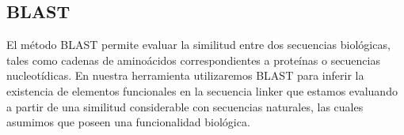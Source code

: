 
































\subsection{BLAST}\label{blast}

El método BLAST \cite{altschul1990basic,mcginnis2004blast} permite evaluar la similitud entre dos secuencias biológicas, tales como cadenas de aminoácidos correspondientes a proteínas o secuencias nucleotídicas.
En nuestra herramienta utilizaremos BLAST para inferir la existencia de elementos funcionales en la secuencia linker que estamos evaluando a partir de una similitud considerable con secuencias naturales, 
las cuales asumimos que poseen una funcionalidad biológica.


